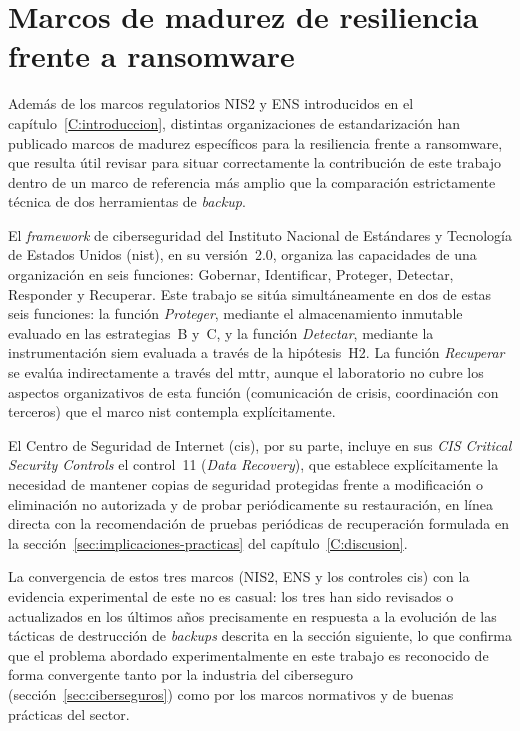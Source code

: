 \documentclass[../main.tex]{subfiles}
\begin{document}
\section{Marcos de madurez de resiliencia frente a ransomware}
\label{sec:marcos-madurez}

Además de los marcos regulatorios NIS2 y ENS introducidos en el
capítulo~\ref{C:introduccion}, distintas organizaciones de estandarización han
publicado marcos de madurez específicos para la resiliencia frente a
ransomware, que resulta útil revisar para situar correctamente la contribución
de este trabajo dentro de un marco de referencia más amplio que la comparación
estrictamente técnica de dos herramientas de \emph{backup}.

El \emph{framework} de ciberseguridad del Instituto Nacional de Estándares y
Tecnología de Estados Unidos (\gls{nist}), en su versión~2.0, organiza las
capacidades de una organización en seis funciones: Gobernar, Identificar,
Proteger, Detectar, Responder y Recuperar. Este trabajo se sitúa
simultáneamente en dos de estas seis funciones: la función \emph{Proteger},
mediante el almacenamiento inmutable evaluado en las estrategias~B y~C, y la
función \emph{Detectar}, mediante la instrumentación \gls{siem} evaluada a
través de la hipótesis~H2. La función \emph{Recuperar} se evalúa
indirectamente a través del \gls{mttr}, aunque el laboratorio no cubre los
aspectos organizativos de esta función (comunicación de crisis, coordinación
con terceros) que el marco \gls{nist} contempla explícitamente.

El Centro de Seguridad de Internet (\gls{cis}), por su parte, incluye en sus
\emph{CIS Critical Security Controls} el control~11 (\emph{Data Recovery}),
que establece explícitamente la necesidad de mantener copias de seguridad
protegidas frente a modificación o eliminación no autorizada y de probar
periódicamente su restauración, en línea directa con la recomendación de
pruebas periódicas de recuperación formulada en la
sección~\ref{sec:implicaciones-practicas} del capítulo~\ref{C:discusion}.

La convergencia de estos tres marcos (NIS2, ENS y los controles \gls{cis}) con la evidencia experimental de este \pfg no es casual: los tres han
sido revisados o actualizados en los últimos años precisamente en respuesta a
la evolución de las tácticas de destrucción de \emph{backups} descrita en la
sección siguiente, lo que confirma que el problema abordado experimentalmente
en este trabajo es reconocido de forma convergente tanto por la industria del
ciberseguro (sección~\ref{sec:ciberseguros}) como por los marcos normativos y
de buenas prácticas del sector.
\end{document}
